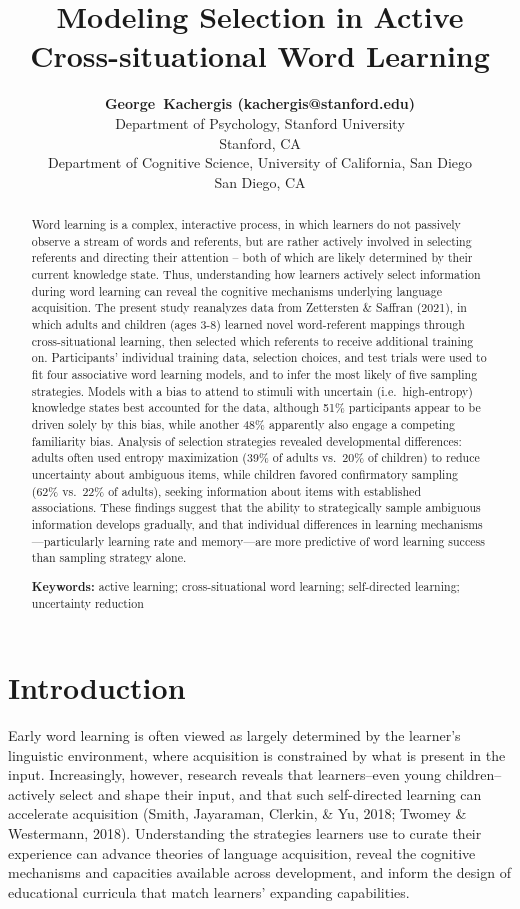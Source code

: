 \documentclass[10pt, letterpaper]{article}
\title{Modeling Selection in Active Cross-situational Word Learning}
\author{{\large \bf George~Kachergis (kachergis@stanford.edu)} \\ Department of Psychology, Stanford University \\ Stanford, CA \AND {\large \bf Martin~Zettersten (mzettersten@ucsd.edu)} \\ Department of Cognitive Science, University of California, San Diego \\ San Diego, CA}
\begin{document}
\maketitle

\begin{abstract}
Word learning is a complex, interactive process, in which learners do
not passively observe a stream of words and referents, but are rather
actively involved in selecting referents and directing their attention
-- both of which are likely determined by their current knowledge state.
Thus, understanding how learners actively select information during word
learning can reveal the cognitive mechanisms underlying language
acquisition. The present study reanalyzes data from Zettersten \&
Saffran (2021), in which adults and children (ages 3-8) learned novel
word-referent mappings through cross-situational learning, then selected
which referents to receive additional training on. Participants'
individual training data, selection choices, and test trials were used
to fit four associative word learning models, and to infer the most
likely of five sampling strategies. Models with a bias to attend to
stimuli with uncertain (i.e.~high-entropy) knowledge states best
accounted for the data, although 51\% participants appear to be driven
solely by this bias, while another 48\% apparently also engage a
competing familiarity bias. Analysis of selection strategies revealed
developmental differences: adults often used entropy maximization (39\%
of adults vs.~20\% of children) to reduce uncertainty about ambiguous
items, while children favored confirmatory sampling (62\% vs.~22\% of
adults), seeking information about items with established associations.
These findings suggest that the ability to strategically sample
ambiguous information develops gradually, and that individual
differences in learning mechanisms---particularly learning rate and
memory---are more predictive of word learning success than sampling
strategy alone.

\textbf{Keywords:}
active learning; cross-situational word learning; self-directed
learning; uncertainty reduction
\end{abstract}

\section{Introduction}\label{introduction}

Early word learning is often viewed as largely determined by the
learner's linguistic environment, where acquisition is constrained by
what is present in the input. Increasingly, however, research reveals
that learners--even young children--actively select and shape their
input, and that such self-directed learning can accelerate acquisition
(Smith, Jayaraman, Clerkin, \& Yu, 2018; Twomey \& Westermann, 2018).
Understanding the strategies learners use to curate their experience can
advance theories of language acquisition, reveal the cognitive
mechanisms and capacities available across development, and inform the
design of educational curricula that match learners' expanding
capabilities.
\end{document}
